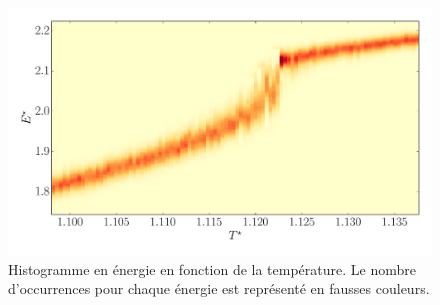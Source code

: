 \documentclass[11pt]{article}
\numberwithin{equation}{section}
\begin{document}
\begin{figure}[h!]
    \centering	    
	\includegraphics[scale=0.5]{figures/histo_image.pdf}
    \caption{Histogramme en énergie en fonction de la température. Le nombre d’occurrences pour chaque énergie est représenté en fausses couleurs.}
    	\label{imagehisto} 
\end{figure}
\end{document}
